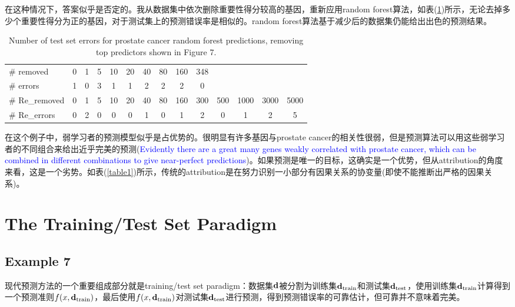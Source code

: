 \documentclass[lang=cn,11pt,a4paper,cite=authoryear]{elegantpaper}
\begin{document}
在这种情况下，答案似乎是否定的。我从数据集中依次删除重要性得分较高的基因，重新应用random forest算法，如表(\ref{table3})所示，无论去掉多少个重要性得分为正的基因，对于测试集上的预测错误率是相似的。random forest算法基于减少后的数据集仍能给出出色的预测结果。

\begin{table}[H]
    \centering
    \caption{Number of test set errors for prostate cancer random forest predictions, removing top predictors shown in Figure 7.}
    \label{table3}
    \begin{tabular}{lccccccccccccc}
    	\toprule
        \# removed & 0 & 1 & 5 & 10 & 20 & 40 & 80 & 160 & 348 &&&&\\
        \# errors & 1 & 0 & 3 & 1 & 1 & 2 & 2 & 2 & 0 &&&&\\ 
        \midrule
        \# Re\_removed & 0 & 1 & 5 & 10 & 20 & 40 & 80 & 160 & 300 & 500 & 1000 & 3000 & 5000 \\
        \# Re\_errors & 0 & 2 & 0 & 0 & 0 & 1 & 0 & 1 & 2 & 0 & 1 & 2 & 5 \\
        \bottomrule
    \end{tabular}
\end{table}

在这个例子中，弱学习者的预测模型似乎是占优势的。很明显有许多基因与prostate cancer的相关性很弱，但是预测算法可以用这些弱学习者的不同组合来给出近乎完美的预测(\textcolor{blue}{Evidently there are a great many genes weakly correlated with prostate cancer, which can be combined in different combinations to give near-perfect predictions})。如果预测是唯一的目标，这确实是一个优势，但从attribution的角度来看，这是一个劣势。如表(\ref{table1})所示，传统的attribution是在努力识别一小部分有因果关系的协变量(即使不能推断出严格的因果关系)。

\section{The Training/Test Set Paradigm}

\subsection{Example 7}

现代预测方法的一个重要组成部分就是training/test set paradigm：数据集$\bold{d}$被分割为训练集$\bold{d}_{\text{train}}$和测试集$\bold{d}_{\text{test}}$，使用训练集$\bold{d}_{\text{train}}$计算得到一个预测准则$f(x, \bold{d}_{\text{train}})$，最后使用$f(x, \bold{d}_{\text{train}})$对测试集$\bold{d}_{\text{test}}$进行预测，得到预测错误率的可靠估计，但可靠并不意味着完美。
\end{document}
